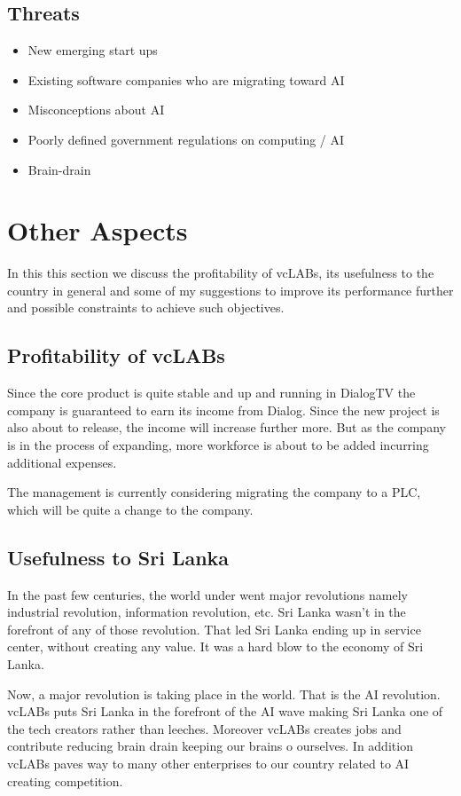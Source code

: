 \subsection{Threats}
\begin{itemize}
\item New emerging start ups
\item Existing software companies who are migrating toward AI
\item Misconceptions about AI
\item Poorly defined government regulations on computing / AI
\item Brain-drain
\end{itemize}

\section{Other Aspects}
In this this section we discuss the profitability of vcLABs, its usefulness to the country in general and some of my suggestions to improve its performance further and possible constraints to achieve such objectives.

\subsection{Profitability of vcLABs}
Since the core product is quite stable and up and running in DialogTV the company is guaranteed to earn its income from Dialog. Since the new project is also about to release, the income will increase further more. But as the company is in the process of expanding, more workforce is about to be added incurring additional expenses.

The management is currently considering migrating the company to a PLC, which will be quite a change to the company.

\subsection{Usefulness to Sri Lanka}
In the past few centuries, the world under went major revolutions namely industrial revolution, information revolution, etc. Sri Lanka wasn't in the forefront of any of those revolution. That led Sri Lanka ending up in service center, without creating any value. It was a hard blow to the economy of Sri Lanka.

Now, a major revolution is taking place in the world. That is the AI revolution. vcLABs puts Sri Lanka in the forefront of the AI wave making Sri Lanka one of the tech creators rather than leeches. Moreover vcLABs creates jobs and contribute reducing brain drain keeping our brains o ourselves. In addition vcLABs paves way to many other enterprises to our country related to AI creating competition.


